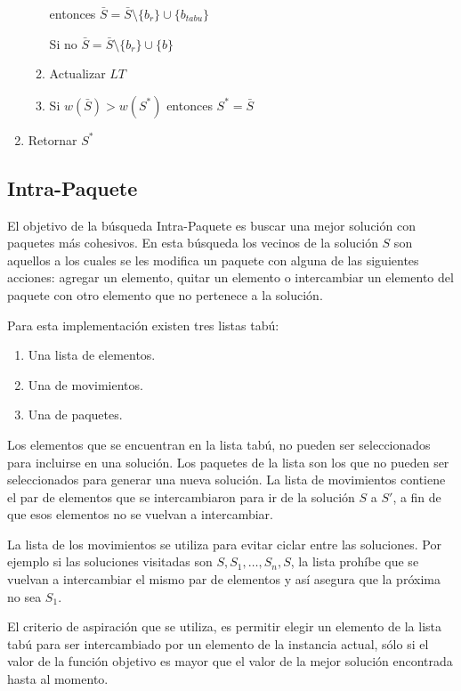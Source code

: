 \begin{enumerate}
\begin{enumerate}
entonces $\bar{S} = \bar{S} \setminus \{b_r\} \cup \{b_{tabu}\}$

Si no $\bar{S} = \bar{S} \setminus \{b_r\} \cup \{b\}$

\item Actualizar $LT$

\item Si $w(\bar{S})>w(S^*)$ entonces $S^*=\bar{S}$

\end{enumerate}

\item Retornar $S^*$

\end{enumerate}

\subsection{Intra-Paquete}
El objetivo de la búsqueda Intra-Paquete es buscar una mejor solución con paquetes más cohesivos. En esta búsqueda los vecinos de la solución $S$ son aquellos a los cuales se les modifica un paquete con alguna de las siguientes acciones: agregar un elemento, quitar un elemento o intercambiar un elemento del paquete con otro elemento que no pertenece a la solución. 

Para esta implementación existen tres listas tabú: 
\begin{enumerate}
	\item Una lista de elementos.
	\item Una de movimientos.
	\item Una de paquetes.
\end{enumerate}

Los elementos que se encuentran en la lista tabú, no pueden ser seleccionados para incluirse en una solución. Los paquetes de la lista son los que no pueden ser seleccionados para generar una nueva solución. La lista de movimientos contiene el par de elementos que se intercambiaron para ir de la solución $S$ a $S'$, a fin de que esos elementos no se vuelvan a intercambiar.

La lista de los movimientos se utiliza para evitar ciclar entre las soluciones. Por ejemplo si las soluciones visitadas son $S, S_1, \ldots, S_n, S$, la lista prohíbe que se vuelvan a intercambiar el mismo par de elementos y así asegura que la próxima no sea $S_1$.

El criterio de aspiración que se utiliza, es permitir elegir un elemento de la lista tabú para ser intercambiado por un elemento de la instancia actual, sólo si el valor de la función objetivo es mayor que el valor de la mejor solución encontrada hasta al momento.

